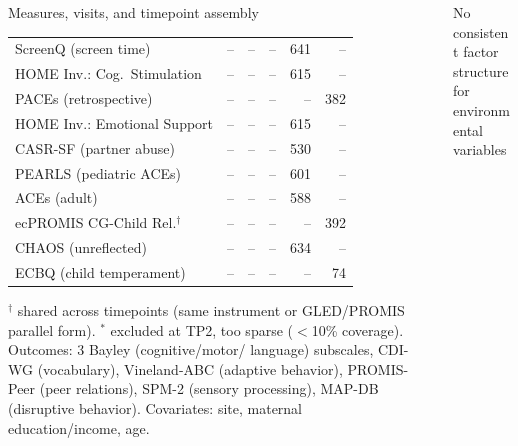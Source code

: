 \documentclass[final]{beamer}
\newlength{\sepwidth}
\newlength{\colwidth}
\newcommand{\separatorcolumn}{\begin{column}{\sepwidth}\end{column}}
\begin{document}
\begin{frame}[t]
\begin{columns}[t]
\begin{column}{\colwidth}
\begin{block}{Measures, visits, and timepoint assembly}
\begin{tabularx}{\linewidth}{X r r r r r}
            ScreenQ (screen time) & -- & -- & -- & 641 & -- \\
            HOME Inv.: Cog.\ Stimulation & -- & -- & -- & 615 & -- \\
            PACEs (retrospective) & -- & -- & -- & -- & 382 \\
            HOME Inv.: Emotional Support & -- & -- & -- & 615 & -- \\
            CASR-SF (partner abuse) & -- & -- & -- & 530 & -- \\
            PEARLS (pediatric ACEs) & -- & -- & -- & 601 & -- \\
            ACEs (adult) & -- & -- & -- & 588 & -- \\
            ecPROMIS CG-Child Rel.$^\dagger$ & -- & -- & -- & -- & 392 \\
            CHAOS (unreflected) & -- & -- & -- & 634 & -- \\
            ECBQ (child temperament) & -- & -- & -- & -- & 74 \\
            \bottomrule
          \end{tabularx}

          \vspace{0.05cm}
          {\fontsize{9}{9.5}\selectfont\setlength{\parskip}{0pt}
          $^\dagger$ shared across timepoints (same instrument or
          GLED/PROMIS parallel form). $^*$ excluded at TP2, too sparse
          ($<$10\% coverage). Outcomes: 3 Bayley (cognitive/motor/
          language) subscales, CDI-WG (vocabulary),
          Vineland-ABC (adaptive behavior), PROMIS-Peer (peer
          relations), SPM-2 (sensory processing), MAP-DB (disruptive
          behavior). Covariates: site, maternal education/income,
          age.\par}
        \end{block}
      \end{column}

\separatorcolumn

\begin{column}{\colwidth}
  \begin{block}{No consistent factor structure for environmental variables}


\end{block}
\end{column}
\end{columns}
\end{frame}
\end{document}
